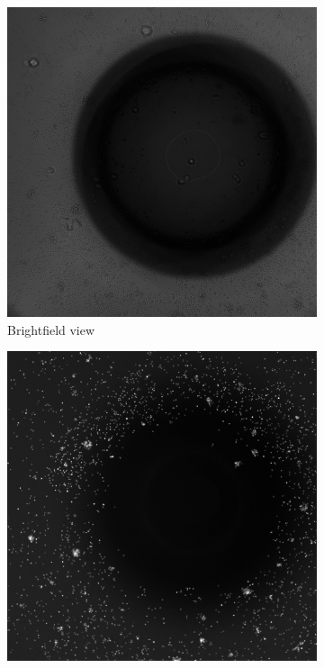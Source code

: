 \begin{figure}[h]
    \centering
    \begin{subfigure}[h!]{0.3\textwidth}
        \includegraphics[width=\textwidth]{dissertation/figures/faulty_brightfield.jpg}
        \caption{Brightfield view}
    \end{subfigure}
    \begin{subfigure}[h!]{0.3\textwidth}
        \includegraphics[width=\textwidth]{dissertation/figures/faulty_tcell.jpg}

\end{subfigure}
\end{figure}
